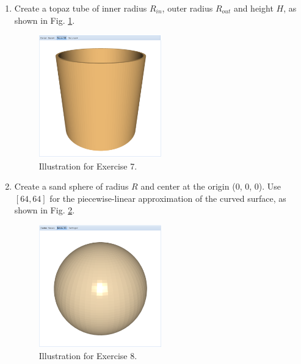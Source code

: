 \documentclass{article}
\begin{document}
\begin{enumerate}
\item Create a topaz tube of inner radius $R_{in}$, outer radius $R_{out}$
and height $H$, as shown in Fig. \ref{fig:a7}.


\begin{figure}[!ht]
\begin{center}
\includegraphics[width=0.5\textwidth]{img/a7-topaz-tube.png}
\end{center}
\vspace{-2mm}
\caption{Illustration for Exercise 7.}
\label{fig:a7}
\end{figure}

\item Create a sand sphere of radius $R$ and center at the origin (0, 0, 0). 
Use $[64, 64]$ for the piecewise-linear approximation of the curved surface, 
as shown in Fig. \ref{fig:a8}.


\begin{figure}[!ht]
\begin{center}
\includegraphics[width=0.5\textwidth]{img/a8-sand-sphere.png}
\end{center}
\vspace{-2mm}
\caption{Illustration for Exercise 8.}
\label{fig:a8}
\vspace{-1cm}
\end{figure}
\newpage


\end{enumerate}
\end{document}
